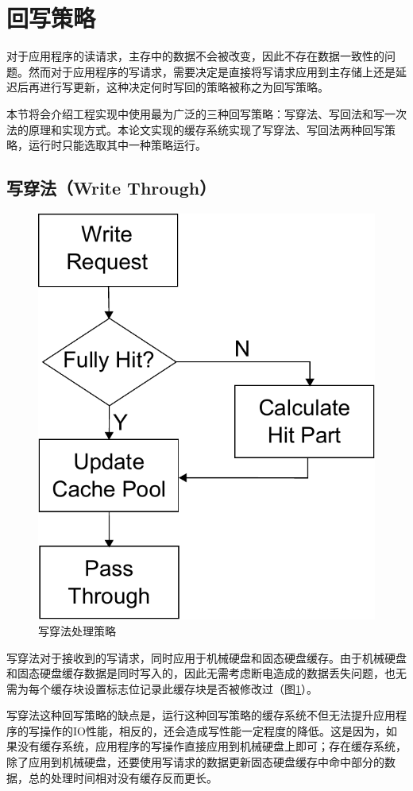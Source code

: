 \section{回写策略}
\label{sec:wb_strategy}

对于应用程序的读请求，主存中的数据不会被改变，因此不存在数据一致性的问题。然而对于应用程序的写请求，需要决定是直接将写请求应用到主存储上还是延迟后再进行写更新，这种决定何时写回的策略被称之为回写策略\cite{writeback2014}。

本节将会介绍工程实现中使用最为广泛的三种回写策略：写穿法、写回法和写一次法的原理和实现方式。本论文实现的缓存系统实现了写穿法、写回法两种回写策略，运行时只能选取其中一种策略运行。

\subsection{写穿法（Write Through）}
\begin{figure}[!htb]
\centering
\includegraphics[width=0.4\linewidth]{./graph/write-through}
\caption{写穿法处理策略}
\label{fig:write-through}
\end{figure}

写穿法\cite{writethrough2010}对于接收到的写请求，同时应用于机械硬盘和固态硬盘缓存。由于机械硬盘和固态硬盘缓存数据是同时写入的，因此无需考虑断电造成的数据丢失问题，也无需为每个缓存块设置标志位记录此缓存块是否被修改过（图\ref{fig:write-through}）。

写穿法这种回写策略的缺点是，运行这种回写策略的缓存系统不但无法提升应用程序的写操作的IO性能，相反的，还会造成写性能一定程度的降低。这是因为，如果没有缓存系统，应用程序的写操作直接应用到机械硬盘上即可；存在缓存系统，除了应用到机械硬盘，还要使用写请求的数据更新固态硬盘缓存中命中部分的数据，总的处理时间相对没有缓存反而更长。

